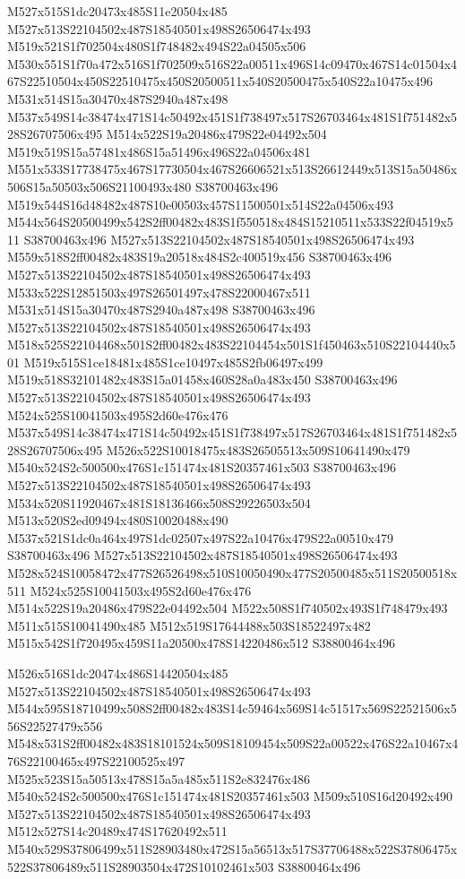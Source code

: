 \documentclass{article}
\begin{document}
\begin{multicols}{2}
M527x515S1dc20473x485S11e20504x485 M527x513S22104502x487S18540501x498S26506474x493 M519x521S1f702504x480S1f748482x494S22a04505x506 M530x551S1f70a472x516S1f702509x516S22a00511x496S14c09470x467S14c01504x467S22510504x450S22510475x450S20500511x540S20500475x540S22a10475x496 M531x514S15a30470x487S2940a487x498 M537x549S14c38474x471S14c50492x451S1f738497x517S26703464x481S1f751482x528S26707506x495 M514x522S19a20486x479S22e04492x504 M519x519S15a57481x486S15a51496x496S22a04506x481 M551x533S17738475x467S17730504x467S26606521x513S26612449x513S15a50486x506S15a50503x506S21100493x480 S38700463x496 M519x544S16d48482x487S10e00503x457S11500501x514S22a04506x493 M544x564S20500499x542S2ff00482x483S1f550518x484S15210511x533S22f04519x511 S38700463x496 M527x513S22104502x487S18540501x498S26506474x493 M559x518S2ff00482x483S19a20518x484S2c400519x456 S38700463x496 M527x513S22104502x487S18540501x498S26506474x493 M533x522S12851503x497S26501497x478S22000467x511 M531x514S15a30470x487S2940a487x498 S38700463x496 M527x513S22104502x487S18540501x498S26506474x493 M518x525S22104468x501S2ff00482x483S22104454x501S1f450463x510S22104440x501 M519x515S1ce18481x485S1ce10497x485S2fb06497x499 M519x518S32101482x483S15a01458x460S28a0a483x450 S38700463x496 M527x513S22104502x487S18540501x498S26506474x493 M524x525S10041503x495S2d60e476x476 M537x549S14c38474x471S14c50492x451S1f738497x517S26703464x481S1f751482x528S26707506x495 M526x522S10018475x483S26505513x509S10641490x479 M540x524S2c500500x476S1c151474x481S20357461x503 S38700463x496 M527x513S22104502x487S18540501x498S26506474x493 M534x520S11920467x481S18136466x508S29226503x504 M513x520S2ed09494x480S10020488x490 M537x521S1dc0a464x497S1dc02507x497S22a10476x479S22a00510x479 S38700463x496 M527x513S22104502x487S18540501x498S26506474x493 M528x524S10058472x477S26526498x510S10050490x477S20500485x511S20500518x511 M524x525S10041503x495S2d60e476x476 M514x522S19a20486x479S22e04492x504 M522x508S1f740502x493S1f748479x493 M511x515S10041490x485 M512x519S17644488x503S18522497x482 M515x542S1f720495x459S11a20500x478S14220486x512 S38800464x496

M526x516S1dc20474x486S14420504x485 M527x513S22104502x487S18540501x498S26506474x493 M544x595S18710499x508S2ff00482x483S14c59464x569S14c51517x569S22521506x556S22527479x556 M548x531S2ff00482x483S18101524x509S18109454x509S22a00522x476S22a10467x476S22100465x497S22100525x497 M525x523S15a50513x478S15a5a485x511S2e832476x486 M540x524S2c500500x476S1c151474x481S20357461x503 M509x510S16d20492x490 M527x513S22104502x487S18540501x498S26506474x493 M512x527S14c20489x474S17620492x511 M540x529S37806499x511S28903480x472S15a56513x517S37706488x522S37806475x522S37806489x511S28903504x472S10102461x503 S38800464x496


\end{multicols}
\end{document}
